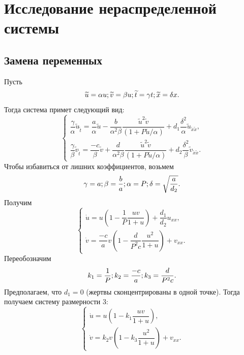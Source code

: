 \documentclass[oneside, final, 12pt]{article}
\begin{document}
\newpage
\section{Исследование нераспределенной системы}						%
\subsection{Замена переменных}
Пусть
\[
    \widetilde{u} = \alpha u;\\
    \widetilde{v} = \beta u;\\
    \widetilde{t} = \gamma t;\\
    \widetilde{x} = \delta x.
\]
Тогда система примет следующий вид:
\[
    \begin{cases}
        \dfrac{\gamma}{\alpha} \widetilde{u}_{\widetilde{t}} =
        \dfrac{a}{\alpha}\widetilde{u}
        - \dfrac{b}{\alpha^2\beta} \dfrac{\widetilde{u}^2\widetilde{v}}{(1 + P\widetilde{u}/\alpha)}
        + d_1\dfrac{\delta^2}{\alpha} \widetilde{u}_{\widetilde{x}\widetilde{x}}, \\

        \dfrac{\gamma}{\beta} \widetilde{v}_{\widetilde{t}} =
        \dfrac{-c}{\beta}\widetilde{v}
        + \dfrac{d}{\alpha^2\beta} \dfrac{\widetilde{u}^2\widetilde{v}}{(1 + P\widetilde{u}/\alpha)}
        + d_2\dfrac{\delta^2}{\beta} \widetilde{v}_{\widetilde{x}\widetilde{x}}.
    \end{cases}
\]
Чтобы избавиться от лишних коэффициентов, возьмем
\[
    \gamma = a;\\
    \beta = \dfrac{b}{a};\\
    \alpha = P;\\
    \delta = \sqrt{\dfrac{a}{d_2}}.
\]
Получим
\[
    \begin{cases}
        \dot{u} = u\left(1 - \dfrac{1}{P} \dfrac{uv}{1 + u}\right)  + \dfrac{d_1}{d_2}u_{xx}, \\
        \dot{v} = \dfrac{-c}{a} v\left(1 - \dfrac{d}{P^{2}c} \dfrac{u^2}{1 + u}\right) + v_{xx}.
    \end{cases}
\]
Переобозначим
\[
    k_1 = \dfrac{1}{P};\\
    k_2 = \dfrac{-c}{a};\\
    k_3 = \dfrac{d}{P^{2}c}.
\]
Предполагаем, что \(d_1 = 0\) (жертвы сконцентрированы в одной точке). Тогда получаем систему размерности 3:
\[
    \begin{cases}
        \dot{u} = u\left(1 -  k_1\dfrac{uv}{1 + u}\right) , \\
        \dot{v} = k_2 v\left(1 - k_3 \dfrac{u^2}{1 + u}\right) + v_{xx}.
    \end{cases}
\]
\end{document}
